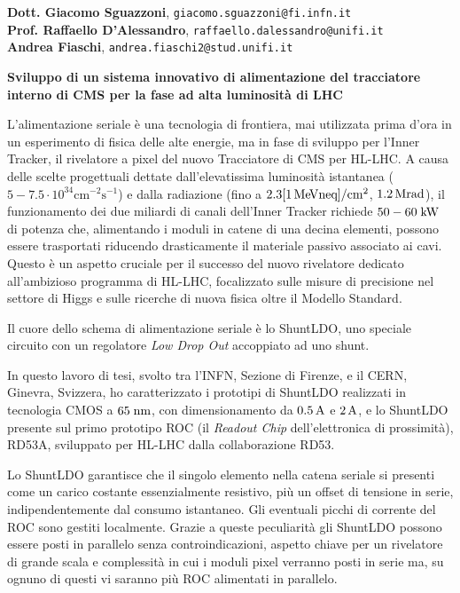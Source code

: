 \documentclass[a4paper,12pt,italian]{article}
\begin{document}

\pagestyle{plain}
\noindent

 {\bf Dott. Giacomo Sguazzoni}, {\tt giacomo.sguazzoni@fi.infn.it}\\
 {\bf Prof. Raffaello D'Alessandro}, {\tt raffaello.dalessandro@unifi.it}\\
 {\bf Andrea Fiaschi}, {\tt andrea.fiaschi2@stud.unifi.it}

\vskip 0.5cm

\noindent \textbf{Sviluppo di un sistema innovativo di alimentazione del tracciatore interno di CMS per la fase ad alta luminosità di LHC}

\vskip 0.5cm

 L'alimentazione seriale \`e una tecnologia di frontiera, mai utilizzata prima d'ora in un esperimento di fisica delle alte energie, ma in fase di sviluppo per l'Inner Tracker, il rivelatore a pixel del nuovo Tracciatore di CMS per HL-LHC. A causa delle scelte progettuali dettate dall'elevatissima luminosit\`a istantanea ($\mathrm{5-7.5\cdot 10^{34}cm^{-2}s^{-1}}$) e dalla radiazione (fino a $\mathrm{2.3 [1{\rm \, Me\kern-0.125em V} neq]/cm^2}$, $1.2{\rm \, Mrad}$), il funzionamento dei due miliardi di canali dell'Inner Tracker richiede $50-60\rm \; kW$ di potenza che, alimentando i moduli in catene di una decina elementi, possono essere trasportati riducendo drasticamente il materiale passivo associato ai cavi. Questo \`e un aspetto cruciale per il successo del nuovo rivelatore dedicato all'ambizioso programma di HL-LHC, focalizzato sulle misure di precisione nel settore di Higgs e sulle ricerche di nuova fisica oltre il Modello Standard.

Il cuore dello schema di alimentazione seriale \`e lo ShuntLDO, uno speciale circuito con un regolatore \textit{Low Drop Out} accoppiato ad uno shunt. 

In questo lavoro di tesi, svolto tra l'INFN, Sezione di Firenze, e il CERN, Ginevra, Svizzera, ho caratterizzato i prototipi di ShuntLDO realizzati in tecnologia CMOS a $65\rm \; nm$, con dimensionamento da $0.5\rm \, A$ e $2\rm \, A$, e lo ShuntLDO presente sul primo prototipo ROC (il \textit{Readout Chip} dell'elettronica di prossimit\`a), RD53A, sviluppato per HL-LHC dalla collaborazione RD53. 

Lo ShuntLDO garantisce che il singolo elemento nella catena seriale si presenti come un carico costante essenzialmente resistivo, pi\`u un offset di tensione in serie, indipendentemente dal consumo istantaneo. Gli eventuali picchi di corrente del ROC sono gestiti localmente.
Grazie a queste peculiarit\`a gli ShuntLDO possono essere posti in parallelo senza controindicazioni, aspetto chiave per un rivelatore di grande scala e complessit\`a in cui i moduli pixel verranno posti in serie ma, su ognuno di questi vi saranno più ROC alimentati in parallelo.
 
\end{document}
